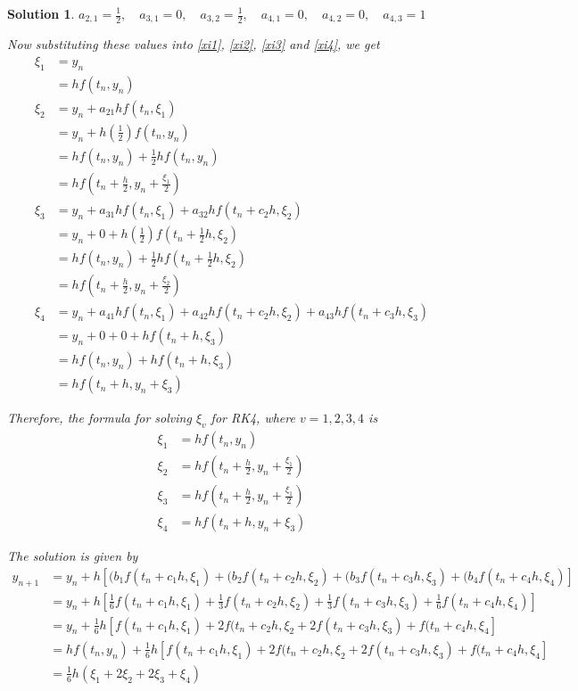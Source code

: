 \documentclass[12pt,a4paper]{article}
\newtheorem{solution}[theorem]{Solution}
\begin{document}
\begin{solution}
\hspace{2pt}

$ a_{2,1} = \frac{1}{2},\quad a_{3,1} = 0,\quad a_{3,2} = \frac{1}{2},\quad a_{4,1} = 0,\quad a_{4,2} = 0,\quad a_{4,3} = 1 $

\hspace{2pt}
Now substituting these values into \ref{xi1}, \ref{xi2}, \ref{xi3} and \ref{xi4}, we get
\begin{align*}
\xi_1 &= y_n \\ 
&= hf(t_n , y_n) \\
\xi_2 &= y_n + a_{21}h f (t_n, \xi_1 ) \\ 
&= y_n + h\left( \frac{1}{2}\right) f(t_n,y_n) \\
&= hf(t_n,y_n) + \frac{1}{2}hf(t_n,y_n) \\
&= hf \left( t_n + \frac{h}{2}, y_n + \frac{\xi_1}{2} \right)  \\
\xi_3 &= y_n + a_{31}h f (t_n, \xi_1 ) + a_{32}h f (t_n + c_2h, \xi_2 ) \\ 
&= y_n + 0 + h\left( \frac{1}{2}\right) f\left( t_n + \frac{1}{2}h, \xi_2 \right)  \\
&= hf(t_n,y_n) + \frac{1}{2}hf\left( t_n + \frac{1}{2}h, \xi_2 \right)  \\
&= hf \left( t_n + \frac{h}{2}, y_n + \frac{\xi_2}{2} \right)  \\
\xi_4 &= y_n + a_{41}h f(t_n, \xi_1 ) + a_{42}h f (t_n + c_2h, \xi_2 ) + a_{43}h f(t_n + c_3h, \xi_3 ) \\
&= y_n + 0 + 0 + hf(t_n + h, \xi_3) \\
&= hf(t_n,y_n) + hf(t_n + h, \xi_3) \\ 
&= hf(t_n + h, y_n + \xi_3)  
\end{align*}

Therefore, the formula for solving $\xi_v$ for RK4, where $v=1,2,3,4$ is 
\begin{align*}
\xi_1 &= hf(t_n , y_n) \\
\xi_2 &= hf \left( t_n + \frac{h}{2}, y_n + \frac{\xi_1}{2} \right) \\
\xi_3 &= hf \left( t_n + \frac{h}{2}, y_n + \frac{\xi_1}{2} \right) \\
\xi_4 &= hf(t_n + h, y_n + \xi_3)
\end{align*}

The solution is given by
\begin{align*}
y_{n+1} &= y_n + h [(b_1f(t_n + c_1h , \xi_1 ) + (b_2f(t_n + c_2h , \xi_2 )+ (b_3f(t_n + c_3h , \xi_3 )+ (b_4f(t_n + c_4h , \xi_4 )] \\
&= y_n + h[\frac{1}{6}f(t_n + c_1h , \xi_1 )+ \frac{1}{3}f(t_n + c_2h , \xi_2) + \frac{1}{3}f(t_n + c_3h , \xi_3 ) + \frac{1}{6}f(t_n + c_4h , \xi_4 )] \\
&= y_n + \frac{1}{6}h[f(t_n + c_1h , \xi_1 ) + 2f(t_n + c_2h , \xi_2 + 2f(t_n + c_3h , \xi_3 ) + f(t_n + c_4h , \xi_4 ]\\
&= hf(t_n,y_n) + \frac{1}{6}h[f(t_n + c_1h , \xi_1 ) + 2f(t_n + c_2h , \xi_2 + 2f(t_n + c_3h , \xi_3 ) + f(t_n + c_4h , \xi_4 ]\\
&= \frac{1}{6}h(\xi_1 + 2\xi_2 + 2\xi_3 + \xi_4)
\end{align*}


\end{solution}
\end{document}
